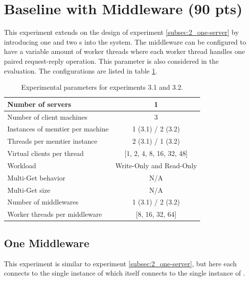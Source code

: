 \section{Baseline with Middleware (90 pts)\label{sec:3}}

    This experiment extends on the design of experiment \ref{subsec:2_one-server} by introducing one and two \mw{}s
    into the system. The middleware can be configured to have a variable amount of worker threads where each worker
    thread handles one paired request-reply operation. This parameter is also considered in the evaluation. The
    configurations are listed in table \ref{tab:30_setup}.

    \begin{table}
        \scriptsize{
            \begin{tabular}{|l|c|}
                \hline Number of servers                & 1 \\
                \hline Number of client machines        & 3 \\
                \hline Instances of memtier per machine & 1 (3.1) / 2 (3.2) \\
                \hline Threads per memtier instance     & 2 (3.1) / 1 (3.2) \\
                \hline Virtual clients per thread       & [1, 2, 4, 8, 16, 32, 48] \\
                \hline Workload                         & Write-Only and Read-Only \\
                \hline Multi-Get behavior               & N/A \\
                \hline Multi-Get size                   & N/A \\
                \hline Number of middlewares            & 1 (3.1) / 2 (3.2) \\
                \hline Worker threads per middleware    & [8, 16, 32, 64]  \\
                \hline
            \end{tabular}
        }
            \caption{Experimental parameters for experiments 3.1 and 3.2.\label{tab:30_setup}}
    \end{table}

    \subsection{One Middleware\label{subsec:3_one-middleware}}

        This experiment is similar to experiment \ref{subsec:2_one-server}, but here each \cli{} connects to the single
        instance of \mw{} which itself connects to the single instance of \srv{}.


